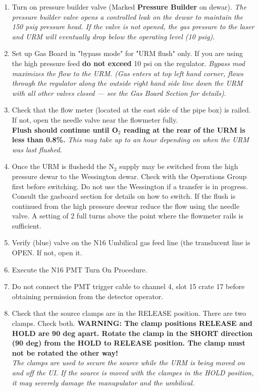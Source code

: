 \documentclass[10pt]{article}
\begin{document}
\begin{enumerate}
\begin{center}
\end{center}
\item \CheckBox[name=n16p13]{} Turn on pressure builder valve (Marked {\bf Pressure Builder} on dewar). {\it The pressure builder valve opens a controlled leak on the dewar to maintain the 150 psig pressure head. If the valve is not opened, the gas pressure to the laser and URM will eventually drop below the operating level (10 psig).}
\item \CheckBox[name=n16p14]{} Set up Gas Board in "bypass mode" for "URM flush" only. If you are using the high pressure feed {\bf do not exceed} 10 psi on the regulator. {\it Bypass mod maximizes the flow to the URM. (Gas enters at top left hand corner, flows through the regulator along the outside right hand side line down the URM with all other valves closed --- see the Gas Board Section for details)}.
\item \CheckBox[name=n16p15]{} Check that the flow meter (located at the east side of the pipe box) is railed. If not, open the needle valve near the flowmeter fully.\\ {\bf Flush should continue until O$_{2}$ reading at the rear of the URM is less than 0.8\%.} {\it This may take up to an hour depending on when the URM was last flushed.}
\item \CheckBox[name=n16p16]{} Once the URM is flushedd the N$_{2}$ supply may be switched from the high pressure dewar to the Wessington dewar. Check with the Operations Group first before switching. Do not use the Wessington if a transfer is in progress. Consult the gasboard section for details on how to switch. If the flush is continued from the high pressure deewar reduce the flow using the needle valve. A setting of 2 full turns above the point where the flowmeter rails is sufficient.
\item \CheckBox[name=n16p17]{} Verify (blue) valve on the N16 Umbilical gas feed line (the translucent line is OPEN. If not, open it.
\item \CheckBox[name=n16p18]{} Execute the N16 PMT Turn On Procedure.
\item \CheckBox[name=n16p19]{} Do not connect the PMT trigger cable to channel 4, slot 15 crate 17 before obtaining permission from the detector operator.
\item \CheckBox[name=n16p20]{} Check that the source clamps are in the RELEASE position. There are two clamps. Check both. {\bf WARNING: The clamp positions RELEASE and HOLD are 90 deg apart. Rotate the clamp in the SHORT direction (90 deg) from the HOLD to RELEASE position. The clamp must not be rotated the other way!}\\ {\it The clamps are used to secure the source while the URM is being moved on and off the UI. If the source is moved with the clampes in the HOLD position, it may severely damage the manupulator and the umbilical.}

\end{enumerate}
\end{document}
